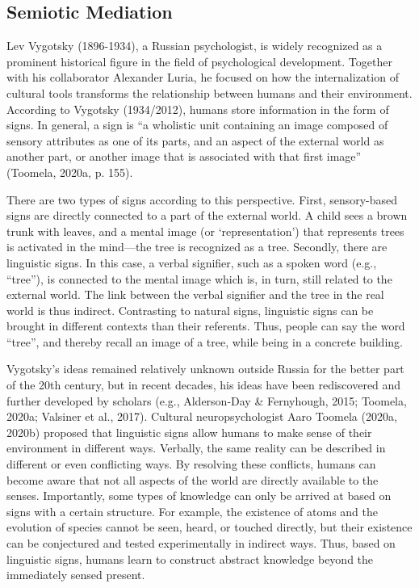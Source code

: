 \documentclass[authordate, reflection]{jote-new-article}
\begin{document}
	\subsection{Semiotic Mediation}



	Lev Vygotsky (1896-1934), a Russian psychologist, is widely recognized as a prominent historical figure in the field of psychological development. Together with his collaborator Alexander Luria, he focused on how the internalization of cultural tools transforms the relationship between humans and their environment. According to Vygotsky (1934/2012), humans store information in the form of signs. In general, a sign is “a wholistic unit containing an image composed of sensory attributes as one of its parts, and an aspect of the external world as another part, or another image that is associated with that first image” (Toomela, 2020a, p. 155).



	There are two types of signs according to this perspective. First, sensory-based signs are directly connected to a part of the external world. A child sees a brown trunk with leaves, and a mental image (or ‘representation') that represents trees is activated in the mind—the tree is recognized as a tree. Secondly, there are linguistic signs. In this case, a verbal signifier, such as a spoken word (e.g., “tree”), is connected to the mental image which is, in turn, still related to the external world. The link between the verbal signifier and the tree in the real world is thus indirect. Contrasting to natural signs, linguistic signs can be brought in different contexts than their referents. Thus, people can say the word “tree”, and thereby recall an image of a tree, while being in a concrete building.



	Vygotsky's ideas remained relatively unknown outside Russia for the better part of the 20th century, but in recent decades, his ideas have been rediscovered and further developed by scholars (e.g., Alderson-Day \& Fernyhough, 2015; Toomela, 2020a; Valsiner et al., 2017). Cultural neuropsychologist Aaro Toomela (2020a, 2020b) proposed that linguistic signs allow humans to make sense of their environment in different ways. Verbally, the same reality can be described in different or even conflicting ways. By resolving these conflicts, humans can become aware that not all aspects of the world are directly available to the senses. Importantly, some types of knowledge can only be arrived at based on signs with a certain structure. For example, the existence of atoms and the evolution of species cannot be seen, heard, or touched directly, but their existence can be conjectured and tested experimentally in indirect ways. Thus, based on linguistic signs, humans learn to construct abstract knowledge beyond the immediately sensed present.
\end{document}
